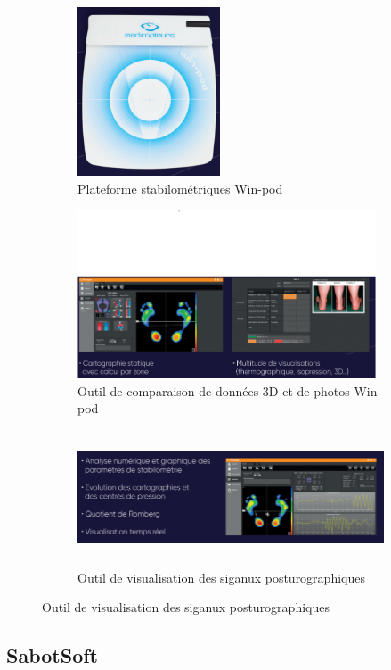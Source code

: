  \begin{figure}[H]
    \centering
    \begin{subfigure}[b]{0.45\textwidth}
      \centering
        \includegraphics[height=5cm]{images/analyse_marche/WinPod.png}
        \caption{Plateforme stabilométriques Win-pod}\label{fig:WinPod}
    \end{subfigure}
    \begin{subfigure}[b]{0.5\textwidth}
        \centering
        \includegraphics[height=5cm]{images/analyse_marche/WinPod1.png}
        \caption{Outil de comparaison de données 3D et de photos Win-pod }\label{fig:WinPod1}
    \end{subfigure}
    \begin{subfigure}[b]{0.5\textwidth}
        \centering  
        \includegraphics[height=4cm]{images/analyse_marche/WinPod2.png}
        \caption{Outil de visualisation des siganux posturographiques}\label{fig:WinPod2}
    \end{subfigure}
\end{figure}

\subsection{SabotSoft}

